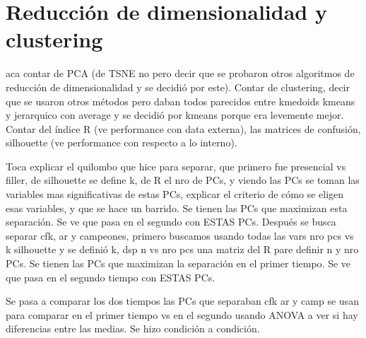 \section{Reducción de dimensionalidad y clustering}
aca contar de PCA (de TSNE no pero decir que se probaron otros algoritmos de reducción de dimensionalidad y se decidió por este). Contar de clustering, decir que se usaron otros métodos pero daban todos parecidos entre kmedoids kmeans y jerarquico con average y se decidió por kmeans porque era levemente mejor. Contar del índice R (ve performance con data externa), las matrices de confusión, silhouette (ve performance con respecto a lo interno).

Toca explicar el quilombo que hice para separar, que primero fue presencial vs filler, de silhouette se define k, de R el nro de PCs, y viendo las PCs se toman las variables mas significativas de estas PCs, explicar el criterio de cómo se eligen esas variables, y que se hace un barrido. Se tienen las PCs que maximizan esta separación. Se ve que pasa en el segundo con ESTAS PCs.
Después se busca separar cfk, ar y campeones, primero buscamos usando todas las vars nro pcs vs k silhouette y se definió k, dsp  n vs nro pcs una matriz del R pare definir n y nro PCs. Se tienen las PCs que maximizan la separación en el primer tiempo. Se ve que pasa en el segundo tiempo con ESTAS PCs.

Se pasa a comparar los dos tiempos las PCs que separaban cfk ar y camp se usan para comparar en el primer tiempo vs en el segundo usando ANOVA a ver si hay diferencias entre las medias. Se hizo condición a condición.